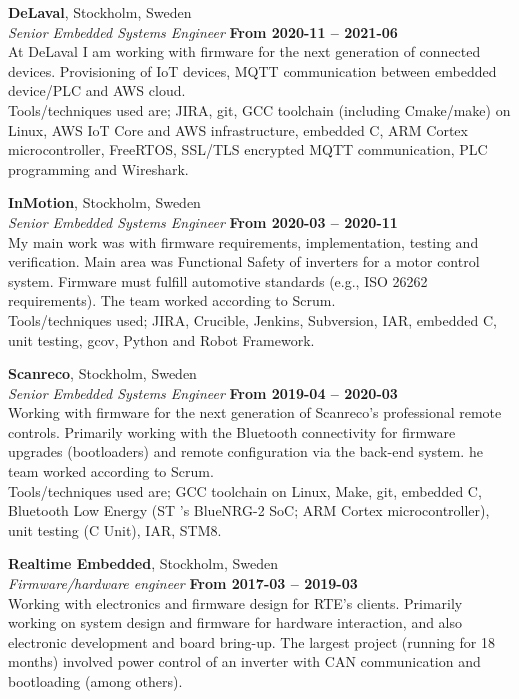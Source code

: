 \documentclass[a4paper,margin,line]{res} \usepackage{latexsym}
\begin{document}
\begin{resume}
{\bf DeLaval}, Stockholm, Sweden\\
{\em Senior Embedded Systems Engineer} \hfill {\bf From 2020-11 --
  2021-06}\\ At DeLaval I am working with firmware for the next
generation of connected devices. Provisioning of IoT devices, MQTT
communication between embedded device/PLC and AWS
cloud. \\ Tools/techniques used are; JIRA, git, GCC toolchain
(including Cmake/make) on Linux, AWS IoT Core and AWS infrastructure,
embedded C, ARM Cortex microcontroller, FreeRTOS, SSL/TLS encrypted
MQTT communication, PLC programming and Wireshark.


{\bf InMotion}, Stockholm, Sweden\\
{\em Senior Embedded Systems Engineer} \hfill {\bf From 2020-03 --
  2020-11}\\ My main work was with firmware requirements,
implementation, testing and verification. Main area was Functional
Safety of inverters for a motor control system. Firmware must fulfill
automotive standards (e.g., ISO 26262 requirements). The team worked
according to Scrum. \\ Tools/techniques used; JIRA, Crucible, Jenkins,
Subversion, IAR, embedded C, unit testing, gcov, Python and Robot
Framework.

{\bf Scanreco}, Stockholm, Sweden\\
{\em Senior Embedded Systems Engineer} \hfill {\bf From 2019-04 --
  2020-03}\\ Working with firmware for the next generation of
Scanreco's professional remote controls. Primarily working with the
Bluetooth connectivity for firmware upgrades (bootloaders) and remote
configuration via the back-end system. he team worked according to
Scrum. \\ Tools/techniques used are; GCC toolchain on Linux, Make, git,
embedded C, Bluetooth Low Energy (ST 's BlueNRG-2 SoC; ARM Cortex
microcontroller), unit testing (C Unit), IAR, STM8.

{\bf Realtime Embedded}, Stockholm, Sweden\\
{\em Firmware/hardware engineer} \hfill {\bf From 2017-03 --
  2019-03}\\ Working with electronics and firmware design for RTE's
clients. Primarily working on system design and firmware for hardware
interaction, and also electronic development and board bring-up. The
largest project (running for 18 months) involved power control of an
inverter with CAN communication and bootloading (among others).


\end{resume}
\end{document}
